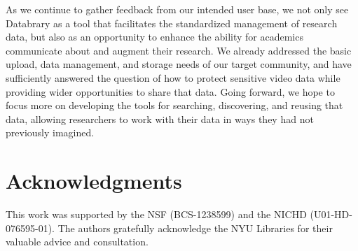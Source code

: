 \documentclass{sig-alternate}
\begin{document}
As we continue to gather feedback from our intended user base, we not only see Databrary as a tool that facilitates the standardized management of research data, but also as an opportunity to enhance the ability for academics communicate about and augment their research. We already addressed the basic upload, data management, and storage needs of our target community, and have sufficiently answered the question of how to protect sensitive video data while providing wider opportunities to share that data. Going forward, we hope to focus more on developing the tools for searching, discovering, and reusing that data, allowing researchers to work with their data in ways they had not previously imagined.

\section*{Acknowledgments}

This work was supported by the NSF (BCS-1238599) and the NICHD (U01-HD-076595-01).
The authors gratefully acknowledge the NYU Libraries for their valuable advice and consultation.



\end{document}
